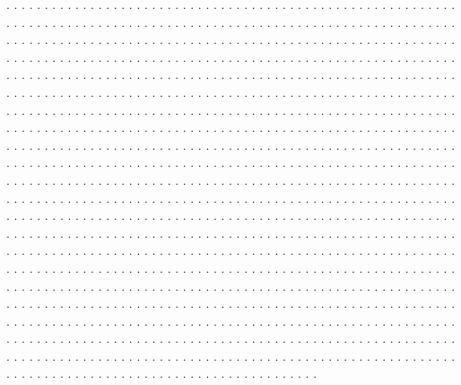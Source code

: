 \documentclass[twocolumn]{revtex4}
\begin{document}
\vspace*{0.5cm}

. . . . . . . . . . . . . . . . . . . . . . . . . . . . . . . . . . . . . . . .
. . . . . . . . . . . . . . . . . . . . . . . . . . . . . . . . . . . . . . . .
. . . . . . . . . . . . . . . . . . . . . . . . . . . . . . . . . . . . . . . .
. . . . . . . . . . . . . . . . . . . . . . . . . . . . . . . . . . . . . . . .
. . . . . . . . . . . . . . . . . . . . . . . . . . . . . . . . . . . . . . . .
. . . . . . . . . . . . . . . . . . . . . . . . . . . . . . . . . . . . . . . .
. . . . . . . . . . . . . . . . . . . . . . . . . . . . . . . . . . . . . . . .
. . . . . . . . . . . . . . . . . . . . . . . . . . . . . . . . . . . . . . . .
. . . . . . . . . . . . . . . . . . . . . . . . . . . . . . . . . . . . . . . .
. . . . . . . . . . . . . . . . . . . . . . . . . . . . . . . . . . . . . . . .
. . . . . . . . . . . . . . . . . . . . . . . . . . . . . . . . . . . . . . . .
. . . . . . . . . . . . . . . . . . . . . . . . . . . . . . . . . . . . . . . .
. . . . . . . . . . . . . . . . . . . . . . . . . . . . . . . . . . . . . . . .
. . . . . . . . . . . . . . . . . . . . . . . . . . . . . . . . . . . . . . . .
. . . . . . . . . . . . . . . . . . . . . . . . . . . . . . . . . . . . . . . .
. . . . . . . . . . . . . . . . . . . . . . . . . . . . . . . . . . . . . . . .
. . . . . . . . . . . . . . . . . . . . . . . . . . . . . . . . . . . . . . . .
. . . . . . . . . . . . . . . . . . . . . . . . . . . . . . . . . . . . . . . .
. . . . . . . . . . . . . . . . . . . . . . . . . . . . . . . . . . . . . . . .
. . . . . . . . . . . . . . . . . . . . . . . . . . . . . . . . . . . . . . . .
. . . . . . . . . . . . . . . . . . . . . . . . . . . . . . . . . . . . . . . .
. . . . . . . . . . . . . . . . . . . . . . . . . . . . . . . . . . . . . . . .
. . . . . . . . . . . . . . . . . . . . . . . . . . . . . . . . . . . . . . . .
. . . . . . . . . . . . . . . . . . . . . . . . . . . . . . . . . . . . . . . .
. . . . . . . . . . . . . . . . . . . . . . . . . . . . . . . . . . . . . . . .
. . . . . . . . . . . . . . . . . . . . . . . . . . . . . . . . . . . . . . . .
. . . . . . . . . . . . . . . . . . . . . . . . . . . . . . . . . . . . . . . .
. . . . . . . . . . . . . . . . . . . . . . . . . . . . . . . . . . . . . . . .
. . . . . . . . . . . . . . . . . . . . . . . . . . . . . . . . . . . . . . . .
. . . . . . . . . . . . . . . . . . . . . . . . . . . . . . . . . . . . . . . .
. . . . . . . . . . . . . . . . . . . . . . . . . . . . . . . . . . . . . . . .
. . . . . . . . . . . . . . . . . . . . . . . . . . . . . . . . . . . . . . . .
\end{document}
